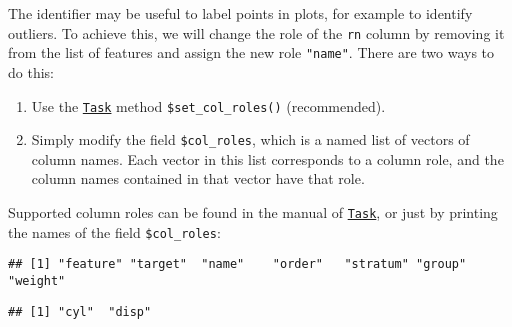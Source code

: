 \documentclass[
]{scrbook}
\newenvironment{Shaded}{\begin{snugshade}}{\end{snugshade}}
\newcommand{\AttributeTok}[1]{\textcolor[rgb]{0.77,0.63,0.00}{#1}}
\newcommand{\CommentTok}[1]{\textcolor[rgb]{0.56,0.35,0.01}{\textit{#1}}}
\newcommand{\FunctionTok}[1]{\textcolor[rgb]{0.00,0.00,0.00}{#1}}
\newcommand{\NormalTok}[1]{#1}
\newcommand{\SpecialCharTok}[1]{\textcolor[rgb]{0.00,0.00,0.00}{#1}}
\newcommand{\StringTok}[1]{\textcolor[rgb]{0.31,0.60,0.02}{#1}}
\providecommand{\tightlist}{%
  \setlength{\itemsep}{0pt}\setlength{\parskip}{0pt}}
\renewenvironment{Shaded} {\begin{snugshade}\small} {\end{snugshade}}
\begin{document}
The identifier may be useful to label points in plots, for example to identify outliers.
To achieve this, we will change the role of the \texttt{rn} column by removing it from the list of features and assign the new role \texttt{"name"}.
There are two ways to do this:

\begin{enumerate}
\def\labelenumi{\arabic{enumi}.}
\tightlist
\item
  Use the \href{https://mlr3.mlr-org.com/reference/Task.html}{\texttt{Task}} method \texttt{\$set\_col\_roles()} (recommended).
\item
  Simply modify the field \texttt{\$col\_roles}, which is a named list of vectors of column names.
  Each vector in this list corresponds to a column role, and the column names contained in that vector have that role.
\end{enumerate}

Supported column roles can be found in the manual of \href{https://mlr3.mlr-org.com/reference/Task.html}{\texttt{Task}}, or just by printing the names of the field \texttt{\$col\_roles}:

\begin{Shaded}
\end{Shaded}

\begin{verbatim}
## [1] "feature" "target"  "name"    "order"   "stratum" "group"   "weight"
\end{verbatim}

\begin{Shaded}
\end{Shaded}

\begin{verbatim}
## [1] "cyl"  "disp"
\end{verbatim}
\end{document}
